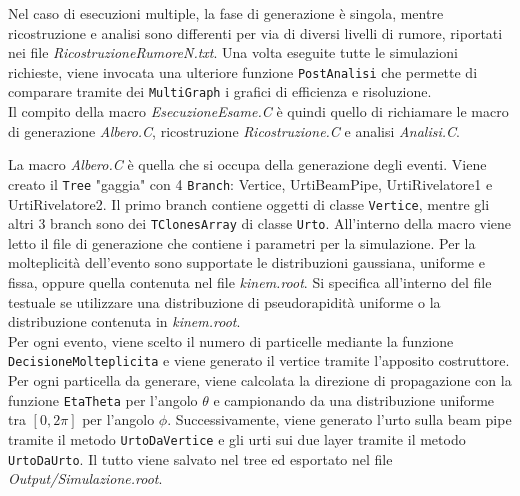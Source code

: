 \documentclass[11pt,a4paper]{article}
\begin{document}
Nel caso di esecuzioni multiple, la fase di generazione è singola, mentre ricostruzione e analisi sono differenti per via di diversi livelli di rumore, riportati nei file \textit{RicostruzioneRumoreN.txt}. Una volta eseguite tutte le simulazioni richieste, viene invocata una ulteriore funzione \lstinline{PostAnalisi} che permette di comparare tramite dei \lstinline{MultiGraph} i grafici di efficienza e risoluzione.\\
Il compito della macro \textit{EsecuzioneEsame.C} è quindi quello di richiamare le macro di generazione \textit{Albero.C}, ricostruzione \textit{Ricostruzione.C} e analisi \textit{Analisi.C}.\\

\par La macro \textit{Albero.C} è quella che si occupa della generazione degli eventi. Viene creato il \lstinline{Tree} "gaggia" con 4 \lstinline{Branch}: Vertice, UrtiBeamPipe, UrtiRivelatore1 e UrtiRivelatore2. Il primo branch contiene oggetti di classe \lstinline{Vertice}, mentre gli altri 3 branch sono dei \lstinline{TClonesArray} di classe \lstinline{Urto}. All'interno della macro viene letto il file di generazione che contiene i parametri per la simulazione. Per la molteplicità dell'evento sono supportate le distribuzioni gaussiana, uniforme e fissa, oppure quella contenuta nel file \textit{kinem.root}. Si specifica all'interno del file testuale se utilizzare una distribuzione di pseudorapidità uniforme o la distribuzione contenuta in \textit{kinem.root}.\\
Per ogni evento, viene scelto il numero di particelle mediante la funzione \lstinline{DecisioneMolteplicita} e viene generato il vertice tramite l'apposito costruttore.\\
Per ogni particella da generare, viene calcolata la direzione di propagazione con la funzione \lstinline{EtaTheta} per l'angolo $\theta$ e campionando da una distribuzione uniforme tra $[0, 2\pi]$ per l'angolo $\phi$. Successivamente, viene generato l'urto sulla beam pipe tramite il metodo \lstinline{UrtoDaVertice} e gli urti sui due layer tramite il metodo \lstinline{UrtoDaUrto}. Il tutto viene salvato nel tree ed esportato nel file \textit{Output/Simulazione.root}.\\
\end{document}
